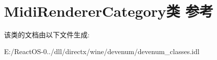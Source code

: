 \hypertarget{class_midi_renderer_category}{}\section{Midi\+Renderer\+Category类 参考}
\label{class_midi_renderer_category}


该类的文档由以下文件生成\+:\begin{DoxyCompactItemize}
\item 
E\+:/\+React\+O\+S-\/0../dll/directx/wine/devenum/devenum\+\_\+classes.\+idl\end{DoxyCompactItemize}
